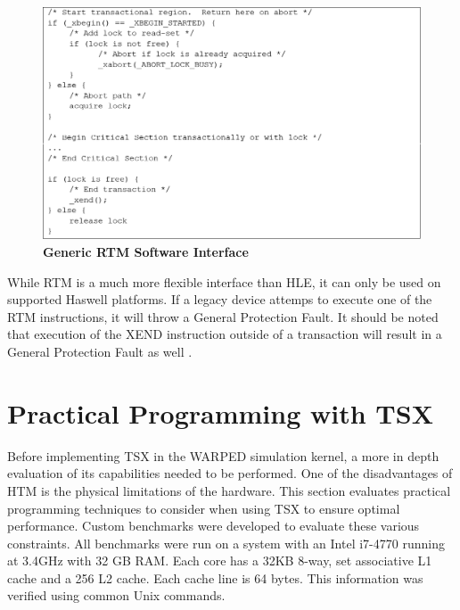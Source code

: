 \documentclass[a4paper]{article}
\begin{document}
\begin{figure}[H]
    \centering
    \graphicspath{ {./figures/} }
    \includegraphics[width=\textwidth,height=\textheight,keepaspectratio]{fig_rtmInterface}
    \caption{\textbf{Generic RTM Software Interface}}
    \label{fig:rtm_interface}
\end{figure}

\indent 
While RTM is a much more flexible interface than HLE, it can only be
used on supported Haswell platforms.  If a legacy device attemps to execute one
of the RTM instructions, it will throw a General Protection Fault.  It should
be noted that execution of the XEND instruction outside of a transaction
will result in a General Protection Fault as well \cite{intel_opt_man}.
\par

\newpage
\section{\textbf{Practical Programming with TSX}}

\indent 
Before implementing TSX in the WARPED simulation kernel, a more in depth
evaluation of its capabilities needed to be performed.  One of the disadvantages
of HTM is the physical limitations of the hardware.  This section evaluates
practical programming techniques to consider when using TSX to ensure optimal
performance.  Custom benchmarks were developed to evaluate these various
constraints.  All benchmarks were run on a system with an Intel i7-4770 running
at 3.4GHz with 32 GB RAM.  Each core has a 32KB 8-way, set associative L1 cache
and a 256 L2 cache.  Each cache line is 64 bytes.  This information was verified
using common Unix commands.
\par
\end{document}
